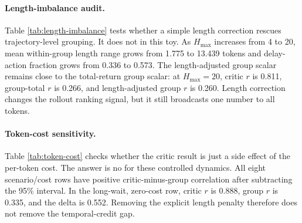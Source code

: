 \documentclass[11pt]{article}
\begin{document}
\begin{table}[!htbp]
\centering
\caption{Length-imbalance audit on the long-wait scenario. Len gap is the mean
within-group max-minus-min trajectory length. Len-adj. is a group scalar based
on return per token; $\Delta_G$ and $\Delta_L$ are critic $r$ minus group-total
and length-adjusted group $r$.}
\label{tab:length-imbalance}
\scriptsize

\end{table}

\paragraph{Length-imbalance audit.}
Table \ref{tab:length-imbalance} tests whether a simple length correction
rescues trajectory-level grouping. It does not in this toy. As $H_{\max}$
increases from 4 to 20, mean within-group length range grows from 1.775 to
13.439 tokens and delay-action fraction grows from 0.336 to 0.573. The
length-adjusted group scalar remains close to the total-return group scalar:
at $H_{\max}=20$, critic $r$ is 0.811, group-total $r$ is 0.266, and
length-adjusted group $r$ is 0.260. Length correction changes the rollout
ranking signal, but it still broadcasts one number to all tokens.

\begin{table}[!htbp]
\centering
\caption{Token-cost sensitivity over 20 seeds. The $c=0$ rows remove the
explicit per-token penalty. CI is a 95\% interval for critic-minus-group
correlation; Wait$_G$ and Wait$_C$ are delay-action magnitude ratios.}
\label{tab:token-cost}
\scriptsize

\end{table}

\paragraph{Token-cost sensitivity.}
Table \ref{tab:token-cost} checks whether the critic result is just a side
effect of the per-token cost. The answer is no for these controlled dynamics.
All eight scenario/cost rows have positive critic-minus-group correlation after
subtracting the 95\% interval. In the long-wait, zero-cost row, critic $r$ is
0.888, group $r$ is 0.335, and the delta is 0.552. Removing the explicit length
penalty therefore does not remove the temporal-credit gap.

\begin{table}[!htbp]
\centering
\caption{Closed-loop tabular policy training under matched generated-token
budgets. Default uses the standard replay budget; low cov. restricts replay and
raises the reliability gate. Cov-gated is an exploratory reliability-gated
baseline.}
\label{tab:closed-loop}
\scriptsize

\end{table}
\end{document}

